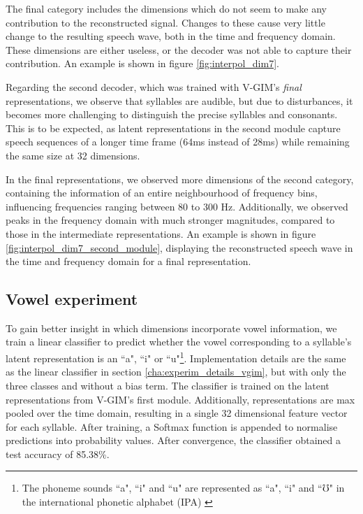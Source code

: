 		The final category includes the dimensions which do not seem to make any contribution to the reconstructed signal. Changes to these cause very little change to the resulting speech wave, both in the time and frequency domain. These dimensions are either useless, or the decoder was not able to capture their contribution. An example is shown in figure \ref{fig:interpol_dim7}.
		
		Regarding the second decoder, which was trained with V-GIM's \textit{final} representations, we observe that syllables are audible, but due to disturbances, it becomes more challenging to distinguish the precise syllables and consonants. This is to be expected, as latent representations in the second module capture speech sequences of a longer time frame (64ms instead of 28ms) while remaining the same size at 32 dimensions.
		
		In the final representations, we observed more dimensions of the second category, containing the information of an entire neighbourhood of frequency bins, influencing frequencies ranging between 80 to 300 Hz. Additionally, we observed peaks in the frequency domain with much stronger magnitudes, compared to those in the intermediate representations. An example is shown in figure \ref{fig:interpol_dim7_second_module}, displaying the reconstructed speech wave in the time and frequency domain for a final representation.
		
		
	
	\subsection{Vowel experiment}
		To gain better insight in which dimensions incorporate vowel information, we train a linear classifier to predict whether the vowel corresponding to a syllable's latent representation is an ``a", ``i" or  ``u"\footnote{The phoneme sounds ``a", ``i" and ``u" are represented as ``a", ``i" and ``$\mho$" in the international phonetic alphabet (IPA) \citep{teachwonderfulLetExploreInternational2021}}. Implementation details are the same as the linear classifier in section \ref{cha:experim_details_vgim}, but with only the three classes and without a bias term. The classifier is trained on the latent representations from V-GIM's first module. Additionally, representations are max pooled over the time domain, resulting in a single 32 dimensional feature vector for each syllable. After training, a Softmax function is appended to normalise predictions into probability values. After convergence, the classifier obtained a test accuracy of 85.38\%.
		
